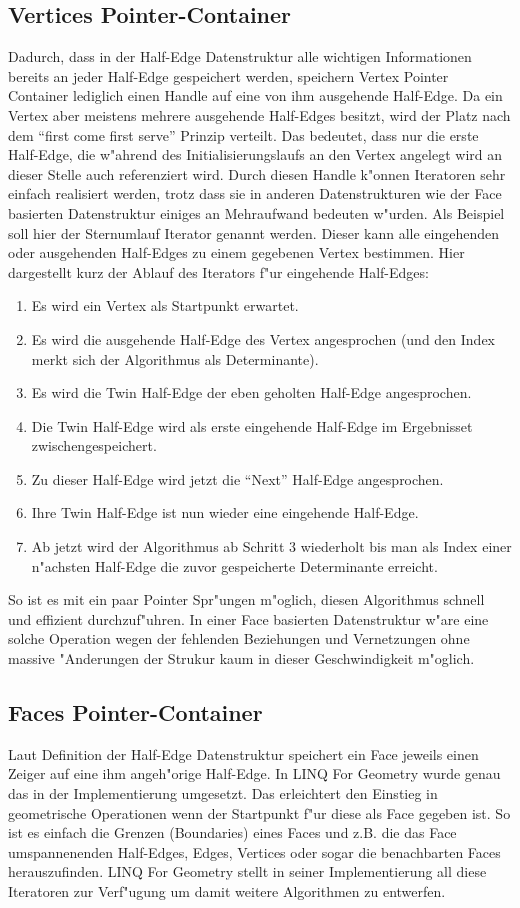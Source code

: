 \documentclass[pagesize, paper=a4, fontsize=12pt,titlepage=true, headings=small, headnosepline, abstractoff, liststotoc, nochapterprefix, plainheadsepline]{scrreprt}
\newcommand{\LFGS}{LINQ For Geometry }
\newcommand{\HES}{Half-Edge Datenstruktur }
\begin{document}
		\subsection {Vertices Pointer-Container}
			Dadurch, dass in der Half-Edge Datenstruktur alle wichtigen Informationen bereits an jeder Half-Edge gespeichert werden, speichern Vertex Pointer Container lediglich einen Handle auf eine von ihm ausgehende Half-Edge. Da ein Vertex aber meistens mehrere ausgehende Half-Edges besitzt, wird der Platz nach dem "`first come first serve"' Prinzip verteilt. Das bedeutet, dass nur die erste Half-Edge, die w"ahrend des Initialisierungslaufs an den Vertex angelegt wird an dieser Stelle auch referenziert wird. Durch diesen Handle k"onnen Iteratoren sehr einfach realisiert werden, trotz dass sie in anderen Datenstrukturen wie der Face basierten Datenstruktur einiges an Mehraufwand bedeuten w"urden. Als Beispiel soll hier der Sternumlauf Iterator genannt werden. Dieser kann alle eingehenden oder ausgehenden Half-Edges zu einem gegebenen Vertex bestimmen. Hier dargestellt kurz der Ablauf des Iterators f"ur eingehende Half-Edges:
\begin{enumerate}
\item Es wird ein Vertex als Startpunkt erwartet.
\item Es wird die ausgehende Half-Edge des Vertex angesprochen (und den Index merkt sich der Algorithmus als Determinante).
\item Es wird die Twin Half-Edge der eben geholten Half-Edge angesprochen.
\item Die Twin Half-Edge wird als erste eingehende Half-Edge im Ergebnisset zwischengespeichert.
\item Zu dieser Half-Edge wird jetzt die "`Next"' Half-Edge angesprochen.
\item Ihre Twin Half-Edge ist nun wieder eine eingehende Half-Edge.
\item Ab jetzt wird der Algorithmus ab Schritt 3 wiederholt bis man als Index einer n"achsten Half-Edge die zuvor gespeicherte Determinante erreicht.
\end{enumerate}

So ist es mit ein paar Pointer Spr"ungen m"oglich, diesen Algorithmus schnell und effizient durchzuf"uhren. In einer Face basierten Datenstruktur w"are eine solche Operation wegen der fehlenden Beziehungen und Vernetzungen ohne massive "Anderungen der Strukur kaum in dieser Geschwindigkeit m"oglich.
		\subsection {Faces Pointer-Container}
			Laut Definition der \HES speichert ein Face jeweils einen Zeiger auf eine ihm angeh"orige Half-Edge. In \LFGS wurde genau das in der Implementierung umgesetzt. Das erleichtert den Einstieg in geometrische Operationen wenn der Startpunkt f"ur diese als Face gegeben ist. So ist es einfach die Grenzen (Boundaries) eines Faces und z.B. die das Face umspannenenden Half-Edges, Edges, Vertices oder sogar die benachbarten Faces herauszufinden. \LFGS stellt in seiner Implementierung all diese Iteratoren zur Verf"ugung um damit weitere Algorithmen zu entwerfen.
\end{document}
